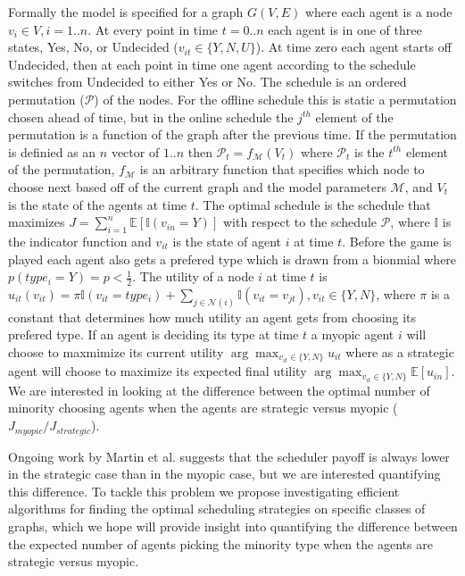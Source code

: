 \documentclass{article}
\begin{document}
Formally the model is specified for a graph $G(V,E)$ where each agent is a node $v_i \in V, i={1..n}$. At every point in time $t={0..n}$ each agent is in one of three states, Yes, No, or Undecided ($v_{it} \in \{Y, N, U\}$). At time zero each agent starts off Undecided, then at each point in time one agent according to the schedule switches from Undecided to either Yes or No. The schedule is an ordered permutation ($\mathcal P$) of the nodes. For the offline schedule this is static a permutation chosen ahead of time, but in the online schedule the $j^{th}$ element of the permutation is a function of the graph after the previous time. If the permutation is definied as an $n$ vector of ${1..n}$  then $\mathcal P_t = f_{\mathcal M}(V_t)$ where $\mathcal P_t$ is the $t^{th}$ element of the permutation, $f_{\mathcal M}$ is an arbitrary function that specifies which node to choose next based off of the current graph and the model parameters $\mathcal M$, and $V_t$ is the state of the agents at time $t$. The optimal schedule is the schedule that maximizes $J = \sum_{i=1}^n \mathbb E[\mathbb I(v_{in} = Y)]$ with respect to the schedule $\mathcal P$, where $\mathbb I$ is the indicator function and $v_{it}$ is the state of agent $i$ at time $t$. Before the game is played each agent also gets a prefered type which is drawn from a bionmial where $p(type_i = Y) = p < \frac{1}{2}$. The utility of a node $i$ at time $t$ is $u_{it}(v_{it}) = \pi \mathbb I(v_{it} = type_i) + \sum_{j \in \mathcal N(i)} \mathbb I(v_{it} = v_{jt}), v_{it} \in \{Y, N\}$, where $\pi$ is a constant that determines how much utility an agent gets from choosing its prefered type. If an agent is deciding its type at time $t$ a myopic agent $i$ will choose to maxmimize its current utility $\arg\max_{v_{it} \in \{Y, N\}} u_{it}$ where as a strategic agent will choose to maximize its expected final utility $\arg\max_{v_{it} \in \{Y, N\}} \mathbb E[u_{in}]$. We are interested in looking at the difference between the optimal number of minority choosing agents when the agents are strategic versus myopic ($J_{myopic} / J_{strategic}$).

Ongoing work by Martin et al. suggests that the scheduler payoff is always lower in the strategic case than in the myopic case, but we are interested quantifying this difference. To tackle this problem we propose investigating efficient algorithms for finding the optimal scheduling strategies on specific classes of graphs, which we hope will provide insight into quantifying the difference between the expected number of agents picking the minority type when the agents are strategic versus myopic.
\end{document}
